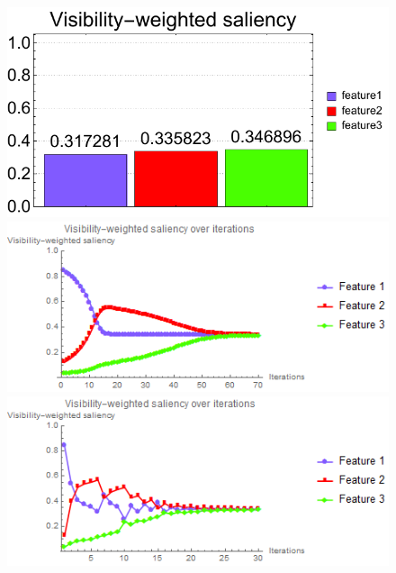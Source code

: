 \begin{figure}
\begin{minipage}{.25\textwidth}
		\subcaption{}
	\end{minipage}~
	\begin{minipage}{.25\textwidth}
		\includegraphics[width=1\linewidth]{figures/vortex_naive_optimized_fixed_visibility_saliency_weighted_chart}
		\subcaption{}
	\end{minipage}	
	
	\begin{minipage}{.49\textwidth}
		\includegraphics[width=1\linewidth]{images/vortex_naive_saliency_fixed}
		\subcaption{}
	\end{minipage}
	\begin{minipage}{.49\textwidth}
		\includegraphics[width=1\linewidth]{images/vortex_naive_saliency_parallelsearch}
		\subcaption{}
	\end{minipage}
	

\end{figure}
